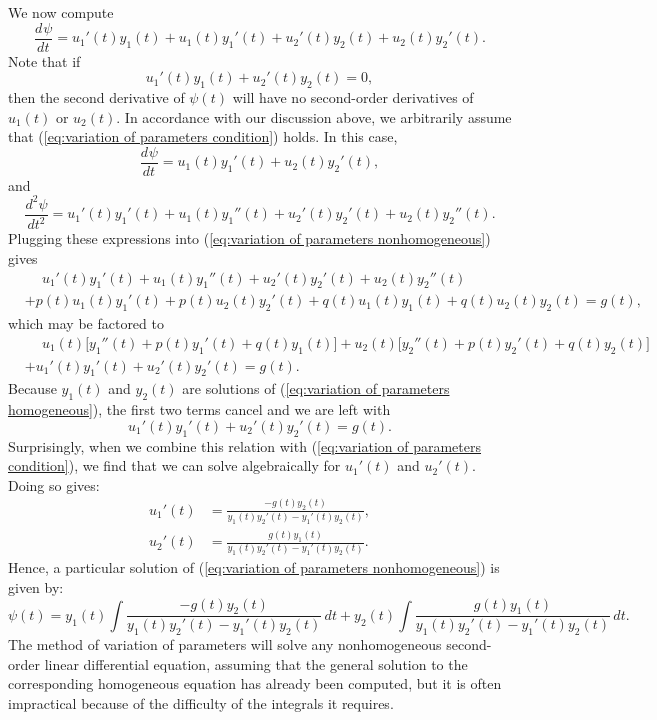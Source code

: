 \documentclass{myart}
\newcommand{\eq}[1]{(\ref{eq:#1})}
\newcommand{\deriv}[3][]{\frac{d^{#1}#2}{d#3^{#1}}}
\begin{document}
We now compute
\begin{equation*}
\deriv{\psi}{t} = u_1'(t)y_1(t) + u_1(t)y_1'(t) + u_2'(t)y_2(t) + u_2(t)y_2'(t).
\end{equation*}
Note that if
\begin{equation} \label{eq:variation of parameters condition}
u_1'(t)y_1(t) + u_2'(t)y_2(t) = 0,
\end{equation}
then the second derivative of $\psi(t)$ will have no second-order derivatives of $u_1(t)$ or $u_2(t)$. In accordance with our discussion above, we arbitrarily assume that \eq{variation of parameters condition} holds. In this case,
\begin{equation*}
\deriv{\psi}{t} = u_1(t)y_1'(t) + u_2(t)y_2'(t),
\end{equation*}
and
\begin{equation*}
\deriv[2]{\psi}{t} = u_1'(t)y_1'(t) + u_1(t)y_1''(t) + u_2'(t)y_2'(t) + u_2(t)y_2''(t).
\end{equation*}
Plugging these expressions into \eq{variation of parameters nonhomogeneous} gives
\begin{align*}
&\phantom{{}+{}} u_1'(t)y_1'(t) + u_1(t)y_1''(t) + u_2'(t)y_2'(t) + u_2(t)y_2''(t) \\
&+ p(t)u_1(t)y_1'(t) + p(t)u_2(t)y_2'(t) + q(t)u_1(t)y_1(t) + q(t)u_2(t)y_2(t) = g(t),
\end{align*}
which may be factored to
\begin{align*}
&\phantom{{}+{}} u_1(t)\Big[y_1''(t) + p(t)y_1'(t) + q(t)y_1(t)\Big] + u_2(t)\Big[y_2''(t) + p(t)y_2'(t) + q(t)y_2(t)\Big] \\
&+ u_1'(t)y_1'(t) + u_2'(t)y_2'(t) = g(t).
\end{align*}
Because $y_1(t)$ and $y_2(t)$ are solutions of \eq{variation of parameters homogeneous}, the first two terms cancel and we are left with
\begin{equation*}
u_1'(t)y_1'(t) + u_2'(t)y_2'(t) = g(t).
\end{equation*}
Surprisingly, when we combine this relation with \eq{variation of parameters condition}, we find that we can solve algebraically for $u_1'(t)$ and $u_2'(t)$. Doing so gives:
\begin{align*}
u_1'(t) &= \frac{-g(t)y_2(t)}{y_1(t)y_2'(t) - y_1'(t)y_2(t)}, \\
u_2'(t) &= \frac{g(t)y_1(t)}{y_1(t)y_2'(t) - y_1'(t)y_2(t)}.
\end{align*}
Hence, a particular solution of \eq{variation of parameters nonhomogeneous} is given by:
\begin{equation*}
\psi(t) = y_1(t) \int \frac{-g(t)y_2(t)}{y_1(t)y_2'(t) - y_1'(t)y_2(t)} \,dt + y_2(t) \int \frac{g(t)y_1(t)}{y_1(t)y_2'(t) - y_1'(t)y_2(t)} \,dt.
\end{equation*}
The method of variation of parameters will solve any nonhomogeneous second-order linear differential equation, assuming that the general solution to the corresponding homogeneous equation has already been computed, but it is often impractical because of the difficulty of the integrals it requires.
\end{document}
